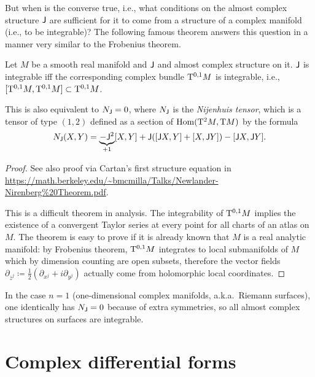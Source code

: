 But when is the converse true, i.e., what conditions on the almost complex structure $\mathsf{J}$ are sufficient for it to come from a structure of a complex manifold (i.e., to be integrable)? The following famous theorem answers this question in a manner very similar to the Frobenius theorem.

\begin{thm}
    Let $M$ be a smooth real manifold and $\mathsf{J}$ and almost complex structure on it. $\mathsf{J}$ is integrable iff the corresponding complex bundle $\mathrm{T}^{0,1}M$ is integrable, i.e., $[\mathrm{T}^{0,1}M,\mathrm{T}^{0,1}M]\subset \mathrm{T}^{0,1}M$.
    
    This is also equivalent to $N_{\mathsf{J}}=0$, where $N_{\mathsf{J}}$ is the \emph{Nijenhuis tensor}, which is a tensor of type $(1,2)$ defined as a section of $\operatorname{Hom}(\mathrm{T}^2M,\mathrm{T} M)$ by the formula
    \[N_{\mathsf{J}}(X,Y)=\underbrace{-\mathsf{J}^2}_{+1}[X,Y]+\mathsf{J}([\mathsf{J} X,Y]+[X,\mathsf{J} Y])-[\mathsf{J} X,\mathsf{J} Y].\]
\end{thm}
\begin{proof}
    See also proof via Cartan's first structure equation  in \url{https://math.berkeley.edu/~bmcmilla/Talks/Newlander-Nirenberg%20Theorem.pdf}.
    
    This is a difficult theorem in analysis. The integrability of $\mathrm{T}^{0,1}M$ implies the existence of a convergent Taylor series at every point for all charts of an atlas on $M$. The theorem is easy to prove if it is already known that $M$ is a real analytic manifold: by Frobenius theorem, $\mathrm{T}^{0,1}M$ integrates to local submanifolds of $M$ which by dimension counting are open subsets, therefore the vector fields $\partial_{\bar z^j}\coloneqq\frac12(\partial_{x^j}+i\partial_{y^j})$ actually come from holomorphic local coordinates.
\end{proof}

\begin{rem}
    In the case $n=1$ (one-dimensional complex manifolds, a.k.a.\ Riemann surfaces), one identically has $N_{\mathsf{J}}=0$ because of extra symmetries, so all almost complex structures on surfaces are integrable.
\end{rem}





\section{Complex differential forms}


